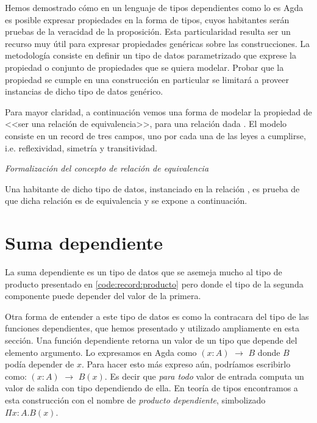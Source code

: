 
Hemos demostrado cómo en un lenguaje de tipos dependientes como lo es Agda es posible expresar propiedades en la forma de tipos, cuyos habitantes serán pruebas de la veracidad de la proposición. Esta particularidad resulta ser un recurso muy útil para expresar propiedades genéricas sobre las construcciones. La metodología consiste en definir un tipo de datos parametrizado que exprese la propiedad o conjunto de propiedades que se quiera modelar. Probar que la propiedad se cumple en una construcción en particular se limitará a proveer instancias de dicho tipo de datos genérico.  

Para mayor claridad, a continuación vemos una forma de modelar la propiedad de <<ser una relación de equivalencia>>, para una relación dada \AgdaDatatype{$\_\approx\_$}. El modelo consiste en un record de tres campos, uno por cada una de las leyes a cumplirse, i.e. reflexividad, simetría y transitividad. 
\begin{agdacode}{\it Formalización del concepto de relación de equivalencia} \label{code:isequiv}

\end{agdacode}

Una habitante de dicho tipo de datos, instanciado en la relación \AgdaDatatype{$\_\equiv\_$}, es prueba de que dicha relación es de equivalencia y se expone a continuación.


\section{Suma dependiente}

La suma dependiente es un tipo de datos que se asemeja mucho al tipo de producto presentado en \ref{code:record:producto} pero donde el tipo de la segunda componente puede depender del valor de la primera.

Otra forma de entender a este tipo de datos es como la contracara del tipo de las funciones dependientes, que 
hemos presentado y utilizado ampliamente en esta sección. Una función dependiente retorna un valor de un tipo que depende del elemento argumento. Lo expresamos en Agda como $(x : A)$ $\to$ $B$ donde $B$ podía depender de $x$. Para hacer esto más expreso aún, podríamos escribirlo como: $(x : A)$ $\to$ $B(x)$. Es decir que {\it para todo} valor de entrada computa un valor de salida con tipo dependiendo de ella. En teoría de tipos encontramos a esta construcción con el nombre de {\it producto dependiente}, simbolizado $\Pi x:A.B(x)$. 

